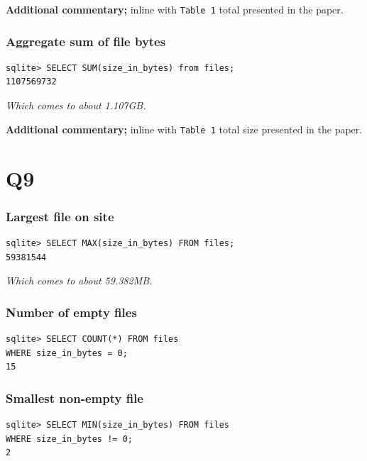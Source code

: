 \documentclass{article}
\begin{document}
\textbf{Additional commentary;} inline with \texttt{Table 1} total presented in the paper.

\subsubsection*{Aggregate sum of file bytes}
\begin{small}
\begin{verbatim}
sqlite> SELECT SUM(size_in_bytes) from files;
1107569732
\end{verbatim}
\end{small}
\textit{Which comes to about 1.107GB.}

\textbf{Additional commentary;} inline with \texttt{Table 1} total size presented in the paper.

\section*{Q9}
\subsubsection*{Largest file on site}
\begin{small}
\begin{verbatim}
sqlite> SELECT MAX(size_in_bytes) FROM files;
59381544
\end{verbatim}
\end{small}
\textit{Which comes to about 59.382MB.}

\subsubsection*{Number of empty files}
\begin{small}
\begin{verbatim}
sqlite> SELECT COUNT(*) FROM files
WHERE size_in_bytes = 0;
15
\end{verbatim}
\end{small}

\subsubsection*{Smallest non-empty file}
\begin{small}
\begin{verbatim}
sqlite> SELECT MIN(size_in_bytes) FROM files 
WHERE size_in_bytes != 0;
2
\end{verbatim}
\end{small}
\end{document}
